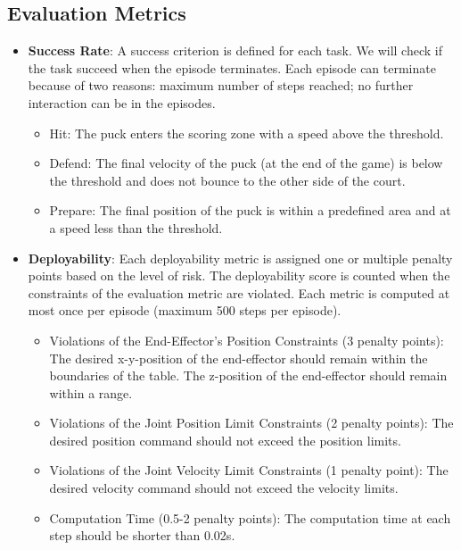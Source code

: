 \subsection{Evaluation Metrics}
\label{sec:evaluation_metrics}
    \begin{itemize}
        \item \textbf{Success Rate}:
        A success criterion is defined for each task. We will check if the task succeed when the episode terminates. Each episode can terminate because of two reasons: maximum number of steps reached; no further interaction can be in the episodes.
        \begin{itemize}
            \item Hit: The puck enters the scoring zone with a speed above the threshold.
            \item Defend: The final velocity of the puck (at the end of the game) is below the threshold and does not bounce to the other side of the court.
            \item Prepare: The final position of the puck is within a predefined area and at a speed less than the threshold.
        \end{itemize}

        \item \textbf{Deployability}: Each deployability metric is assigned one or multiple penalty points based on the level of risk. The deployability score is counted when the constraints of the evaluation metric are violated. Each metric is computed at most once per episode (maximum 500 steps per episode). 
        \begin{itemize}
            \item Violations of the End-Effector's Position Constraints (3 penalty points): 
            The desired x-y-position of the end-effector should remain within the boundaries of the table. The z-position of the end-effector should remain within a range.
            \item Violations of the Joint Position Limit Constraints (2 penalty points): The desired position command should not exceed the position limits.
            \item Violations of the Joint Velocity Limit Constraints (1 penalty point): The desired velocity command should not exceed the velocity limits.
            \item Computation Time (0.5-2 penalty points): The computation time at each step should be shorter than 0.02s.
        \end{itemize}
    \end{itemize}

